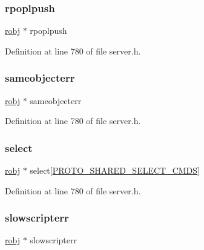 \subsubsection{\texorpdfstring{rpoplpush}{rpoplpush}}
{\footnotesize\ttfamily \hyperlink{server_8h_a540f174d2685422fbd7d12e3cd44c8e2}{robj} $\ast$ rpoplpush}



Definition at line 780 of file server.\+h.

\mbox{\label{structshared_objects_struct_a5d8232e4793ca39381aaf0de4b23023e}} 
\subsubsection{\texorpdfstring{sameobjecterr}{sameobjecterr}}
{\footnotesize\ttfamily \hyperlink{server_8h_a540f174d2685422fbd7d12e3cd44c8e2}{robj} $\ast$ sameobjecterr}



Definition at line 780 of file server.\+h.

\mbox{\label{structshared_objects_struct_a6ee5caf807a005678e7075fd44ce7038}} 
\subsubsection{\texorpdfstring{select}{select}}
{\footnotesize\ttfamily \hyperlink{server_8h_a540f174d2685422fbd7d12e3cd44c8e2}{robj} $\ast$ select\mbox{[}\hyperlink{server_8h_a950a6acbe9809f9e3dc541e8175b7b44}{P\+R\+O\+T\+O\+\_\+\+S\+H\+A\+R\+E\+D\+\_\+\+S\+E\+L\+E\+C\+T\+\_\+\+C\+M\+DS}\mbox{]}}



Definition at line 780 of file server.\+h.

\mbox{\label{structshared_objects_struct_abc68d5d846335b9ca10130c196268b67}} 
\subsubsection{\texorpdfstring{slowscripterr}{slowscripterr}}
{\footnotesize\ttfamily \hyperlink{server_8h_a540f174d2685422fbd7d12e3cd44c8e2}{robj} $\ast$ slowscripterr}



